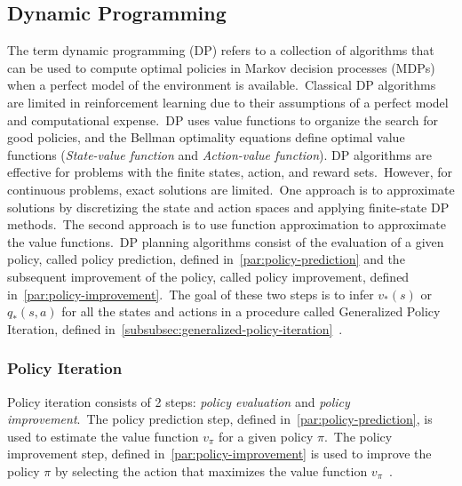 \documentclass[../xlapes02]{subfiles}
\begin{document}
    \subsection{Dynamic Programming}\label{subsec:dynamic-programming}
    The term dynamic programming (DP) refers to a collection of algorithms that can be used to compute optimal policies in Markov decision processes (MDPs) when a perfect model of the environment is available.\ Classical DP algorithms are limited in reinforcement learning due to their assumptions of a perfect model and computational expense.\ DP uses value functions to organize the search for good policies, and the Bellman optimality equations define optimal value functions (\emph{State-value function} and \emph{Action-value function}). DP algorithms are effective for problems with the finite states, action, and reward sets.\ However, for continuous problems, exact solutions are limited.\ One approach is to approximate solutions by discretizing the state and action spaces and applying finite-state DP methods.\ The second approach is to use function approximation to approximate the value functions.\ DP planning algorithms consist of the evaluation of a given policy, called policy prediction, defined in~\cref{par:policy-prediction} and the subsequent improvement of the policy, called policy improvement, defined in~\cref{par:policy-improvement}.\ The goal of these two steps is to infer $v_*(s)$ or $q_*(s,a)$ for all the states and actions in a procedure called Generalized Policy Iteration, defined in~\cref{subsubsec:generalized-policy-iteration}~\cite{sutton2018reinforcement, FITMT25127}.

    \subsubsection{Policy Iteration}\label{subsubsec:policy-iteration}
    Policy iteration consists of 2 steps: \emph{policy evaluation} and \emph{policy improvement}.\ The policy prediction step, defined in~\cref{par:policy-prediction}, is used to estimate the value function $v_{\pi}$ for a given policy $\pi$.\ The policy improvement step, defined in~\cref{par:policy-improvement} is used to improve the policy $\pi$ by selecting the action that maximizes the value function $v_{\pi}$~\cite{sutton2018reinforcement}.
\end{document}
